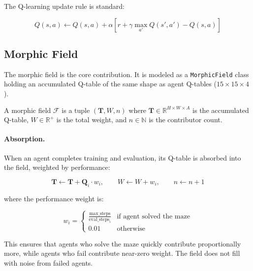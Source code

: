 \documentclass[twoside,11pt]{article}
\begin{document}
The Q-learning update rule is standard:

\begin{equation}
\label{eq:qlearn}
Q(s, a) \leftarrow Q(s, a) + \alpha \left[ r + \gamma \max_{a'} Q(s', a') - Q(s, a) \right]
\end{equation}

\subsection{Morphic Field}
\label{sec:architecture:field}

The morphic field is the core contribution.  It is modeled as a
\texttt{MorphicField} class holding an accumulated Q-table of the same shape
as agent Q-tables ($15 \times 15 \times 4$).

\begin{definition}
A morphic field $\mathcal{F}$ is a tuple $(\mathbf{T}, W, n)$ where
$\mathbf{T} \in \mathbb{R}^{H \times W \times A}$ is the accumulated
Q-table, $W \in \mathbb{R}^+$ is the total weight, and $n \in \mathbb{N}$ is
the contributor count.
\end{definition}

\paragraph{Absorption.}
When an agent completes training and evaluation, its Q-table is absorbed into
the field, weighted by performance:

\begin{equation}
\label{eq:absorb}
\mathbf{T} \leftarrow \mathbf{T} + \mathbf{Q}_i \cdot w_i, \qquad
W \leftarrow W + w_i, \qquad
n \leftarrow n + 1
\end{equation}

where the performance weight is:

\begin{equation}
\label{eq:perfweight}
w_i =
\begin{cases}
\frac{\text{max\_steps}}{\text{eval\_steps}_i} & \text{if agent solved the maze} \\
0.01 & \text{otherwise}
\end{cases}
\end{equation}

This ensures that agents who solve the maze quickly contribute proportionally
more, while agents who fail contribute near-zero weight.  The field does not
fill with noise from failed agents.
\end{document}
